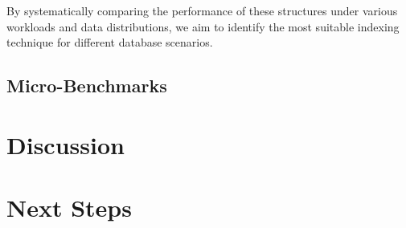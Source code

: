 \documentclass[sigconf]{acmart}
\begin{document}
By systematically comparing the performance of these structures under various workloads and data distributions, we aim to identify the most suitable indexing technique for different database scenarios.

\subsection{Micro-Benchmarks}

\section{Discussion}

\section{Next Steps}

\clearpage



\end{document}
